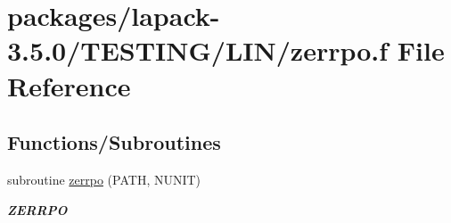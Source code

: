 \hypertarget{zerrpo_8f}{}\section{packages/lapack-\/3.5.0/\+T\+E\+S\+T\+I\+N\+G/\+L\+I\+N/zerrpo.f File Reference}
\label{zerrpo_8f}
\subsection*{Functions/\+Subroutines}
\begin{DoxyCompactItemize}
\item 
subroutine \hyperlink{group__complex16__lin_ga7de48323c06a0c6106e9b9c8398f09f0}{zerrpo} (P\+A\+T\+H, N\+U\+N\+I\+T)
\begin{DoxyCompactList}\small\item\em {\bfseries Z\+E\+R\+R\+P\+O} \end{DoxyCompactList}\end{DoxyCompactItemize}
